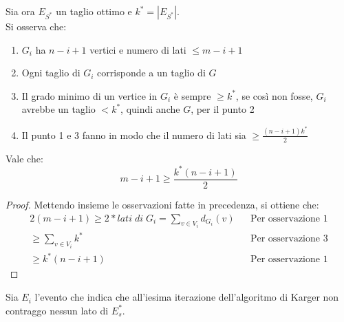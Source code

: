 \begin{remark}
    \label{osskarg}
    Sia ora $E_{S^*}$ un taglio ottimo e $k^* = |E_{S^*}|$.\\
    Si osserva che: 
    \begin{enumerate}
        \item $G_i$ ha $n-i+1$ vertici e numero di lati $\leq m-i +1$ 
        \item Ogni taglio di $G_i$ corrisponde a un taglio di $G$
        \item Il grado minimo di un vertice in $G_i$ è sempre $\geq k^*$, se così non fosse, 
        $G_i$ avrebbe un taglio $< k^*$, quindi anche $G$, per il punto 2
        \item Il punto 1 e 3 fanno in modo che il numero di lati sia $\geq \frac{(n-i+1)k^*}{2}$
    \end{enumerate}    
\end{remark}

\begin{lemma}
    \label{lkarg}
    Vale che:
    $$m-i+1 \geq \frac{k^*(n-i+1)}{2}$$
\end{lemma}
\begin{proof}
    Mettendo insieme le osservazioni fatte in precedenza, si ottiene che:
    \begin{equation}
        \begin{aligned}
            2(m - i + 1 ) \geq 2 * \mathit{lati\;di\;G_i} = \sum_{v \in V_i} d_{G_i}(v) && \text{Per osservazione 1}\\
            \geq \sum_{v \in V_i} k^* && \text{Per osservazione 3}\\
            \geq k^*(n-i+1) && \text{Per osservazione 1}
        \end{aligned}
    \end{equation}
\end{proof}

Sia $E_i$ l'evento che indica che all'iesima iterazione dell'algoritmo di Karger non contraggo nessun lato 
di $E_s^*$.

